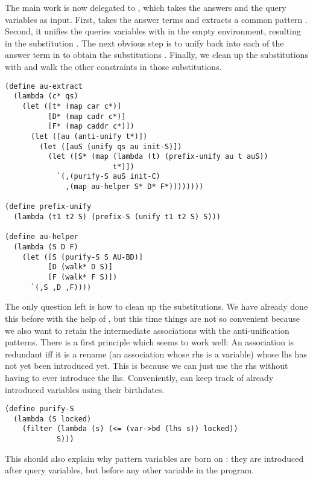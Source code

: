 The main work is now delegated to , which takes the answers and the query variables as input. First,  takes the answer terms  and extracts a common pattern . Second, it unifies the queries variables with  in the empty environment, resulting in the substitution . The next obvious step is to unify  back into each of the answer term in  to obtain the substitutions . Finally, we clean up the substitutions with  and walk the other constraints in those substitutions.
\begin{lstlisting}
(define au-extract
  (lambda (c* qs)
    (let ([t* (map car c*)]
          [D* (map cadr c*)]
          [F* (map caddr c*)])
      (let ([au (anti-unify t*)])
        (let ([auS (unify qs au init-S)])
          (let ([S* (map (lambda (t) (prefix-unify au t auS))
                         t*)])
            `(,(purify-S auS init-C)
              ,(map au-helper S* D* F*))))))))

(define prefix-unify
  (lambda (t1 t2 S) (prefix-S (unify t1 t2 S) S)))

(define au-helper
  (lambda (S D F)
    (let ([S (purify-S S AU-BD)]
          [D (walk* D S)]
          [F (walk* F S)])
      `(,S ,D ,F))))
\end{lstlisting}

The only question left is how to clean up the substitutions. We have already done this before with the help of , but this time things are not so convenient because we also want to retain the intermediate associations with the anti-unification patterns. There is a first principle which seems to work well: An association is redundant iff it is a rename (an association whose rhs is a variable) whose lhs has not yet been introduced yet. This is because we can just use the rhs without having to ever introduce the lhs. Conveniently,  can keep track of already introduced variables using their birthdates.
\begin{lstlisting}
(define purify-S
  (lambda (S locked)
    (filter (lambda (s) (<= (var->bd (lhs s)) locked))
            S)))
\end{lstlisting}

This should also explain why pattern variables are born on : they are introduced after query variables, but before any other variable in the program.